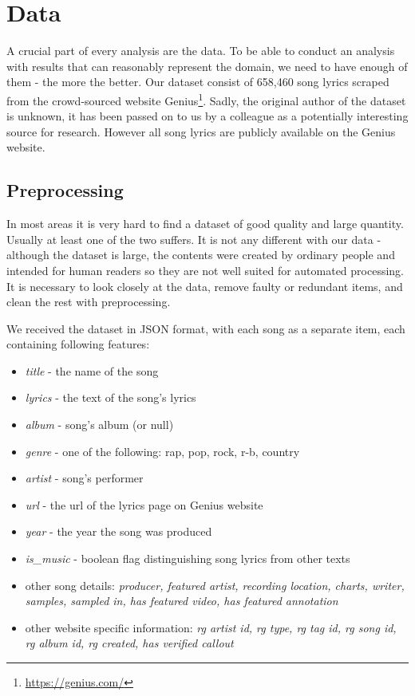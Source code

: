 \chapter{Data}

A crucial part of every analysis are the data. To be able to conduct an analysis with results that can reasonably represent the domain, we need to have enough of them - the more the better. Our dataset consist of 658,460 song lyrics scraped from the crowd-sourced website Genius\footnote{\url{https://genius.com/}}. Sadly, the original author of the dataset is unknown, it has been passed on to us by a colleague as a potentially interesting source for research. However all song lyrics are publicly available on the Genius website.

\section{Preprocessing}

In most areas it is very hard to find a dataset of good quality and large quantity. Usually at least one of the two suffers. It is not any different with our data - although the dataset is large, the contents were created by ordinary people and intended for human readers so they are not well suited for automated processing. It is necessary to look closely at the data, remove faulty or redundant items, and clean the rest with preprocessing.

We received the dataset in JSON format, with each song as a separate item, each containing following features:

\begin{itemize}
	\item \textit{title} - the name of the song
	\item \textit{lyrics} - the text of the song's lyrics
	\item \textit{album} - song's album (or null)
	\item \textit{genre} - one of the following: rap, pop, rock, r-b, country
	\item \textit{artist} - song's performer
	\item \textit{url} - the url of the lyrics page on Genius website
	\item \textit{year} - the year the song was produced
	\item \textit{is\_music} - boolean flag distinguishing song lyrics from other texts
	\item other song details: \textit{producer, featured artist, recording location, charts, writer, samples, sampled in, has featured video, has featured annotation}
	\item other website specific information: \textit{rg artist id, rg type, rg tag id, rg song id, rg album id, rg created, has verified callout}	
\end{itemize}

